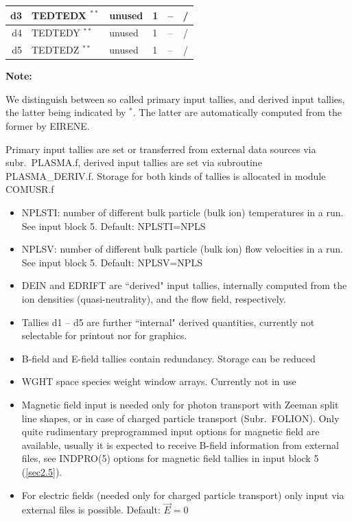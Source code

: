 \begin{landscape}
\begin{longtable}{|r|l|l|l|l|c|}
    \\ \hline
    d3                     & TEDTEDX $^{**}
    $                      & unused                       & 1                                 & --
			   & /                                                                     \\
    \hline
    d4                     & TEDTEDY $^{**}
    $                      & unused                       & 1                                 & --
			   & /                                                                     \\
    \hline
    d5                     & TEDTEDZ $^{**}
    $                      & unused                       & 1                                 & --
			   & /                                                                     \\
    \hline
  \end{longtable}

  \textbf{Note:}

  We distinguish between so called primary input tallies, and
  derived input tallies, the latter being  indicated by $^*$.
  The latter are automatically computed from the former by EIRENE.

  Primary input tallies are set or transferred from external data sources via
  subr.\ PLASMA.f, derived input tallies are set via subroutine PLASMA\_DERIV.f.
  Storage for both kinds of tallies is allocated in module COMUSR.f

  \begin{itemize}
    \item NPLSTI: number of different bulk particle (bulk ion) temperatures in a
	  run.
	  See input block 5.
	  Default: NPLSTI=NPLS
    \item NPLSV: number of different bulk particle (bulk ion) flow velocities
	  in a run.
	  See input block 5.
	  Default: NPLSV=NPLS
    \item DEIN and EDRIFT are ``derived" input tallies, internally computed from
	  the ion densities (quasi-neutrality), and the flow field, respectively.
    \item Tallies d1 -- d5 are further ``internal" derived quantities, currently
	  not selectable for printout nor for graphics.
    \item B-field and E-field tallies contain redundancy.
	  Storage can be reduced
    \item WGHT space species  weight window arrays.
	  Currently not in use
    \item Magnetic field input is needed only for photon transport with Zeeman
	  split line shapes, or in case of charged particle transport (Subr.\ FOLION).
	  Only quite rudimentary preprogrammed input options for magnetic field are
	  available, usually it is expected to receive B-field information from external
	  files, see INDPRO(5) options for magnetic field tallies in input block 5
	  (\cref{sec2.5}).
    \item For electric fields (needed only for charged particle transport) only
	  input via external files is possible.
	  Default: $\vec{E} = 0$
  \end{itemize}


\end{landscape}
